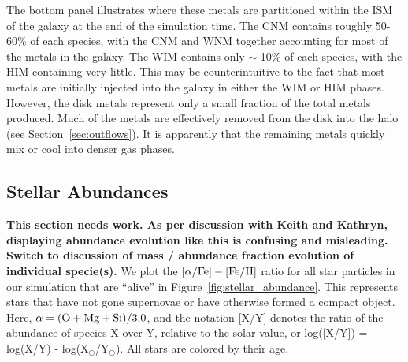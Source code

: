 \documentclass[twocolumn]{aastex61}
\begin{document}
The bottom panel illustrates where these metals are partitioned within the ISM of the galaxy at the end of the simulation time. The CNM contains roughly 50-60\% of each species, with the CNM and WNM together accounting for most of the metals in the galaxy. The WIM contains only $\sim$ 10\% of each species, with the HIM containing very little. This may be counterintuitive to the fact that most metals are initially injected into the galaxy in either the WIM or HIM phases. However, the disk metals represent only a small fraction of the total metals produced. Much of the metals are effectively removed from the disk into the halo (see Section~\ref{sec:outflows}). It is apparently that the remaining metals quickly mix or cool into denser gas phases.

\subsection{Stellar Abundances}
\label{sec:stellar properties}
\textbf{This section needs work. As per discussion with Keith and Kathryn, displaying abundance evolution like this is confusing and misleading. Switch to discussion of mass / abundance fraction evolution of individual specie(s).}
We plot the $[\alpha / {\rm Fe}]-[\rm{Fe}/\rm{H}]$ ratio for all star particles in our simulation that are ``alive'' in Figure~\ref{fig:stellar_abundance}. This represents stars that have not gone supernovae or have otherwise formed a compact object. Here, $\alpha = (\rm{O} + \rm{Mg} + \rm{Si})/3.0$, and the notation [X/Y] denotes the ratio of the abundance of species X over Y, relative to the solar value, or log([X/Y]) = log(X/Y) - log(X$_{\odot}$/Y$_{\odot}$). All stars are colored by their age.
\end{document}
